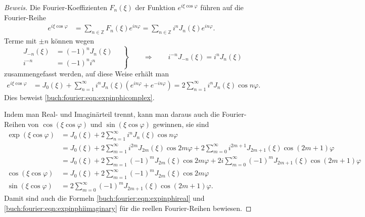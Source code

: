 \begin{proof}[Beweis]
Die Fourier-Koeffizienten $F_n(\xi)$ der Funktion $e^{i\xi\cos\varphi}$
führen auf die Fourier-Reihe
\begin{align*}
e^{i\xi\cos\varphi}
&=
\sum_{n\in\mathbb{Z}} F_n(\xi) e^{in\varphi}
=
\sum_{n\in\mathbb{Z}} i^n J_n(\xi) e^{in\varphi}.
\end{align*}
Terme mit $\pm n$ können wegen
\[
\left.
\begin{aligned}
J_{-n}(\xi) &= (-1)^n J_n(\xi)
\label{buch:fourier:eqn:symetrie}
\\
i^{-n}&=(-1)^n i^n
\end{aligned}
\quad
\right\}
\qquad\Rightarrow\qquad
i^{-n}J_{-n}(\xi) = i^n J_n(\xi)
\]
zusammengefasst werden, auf diese Weise erhält man 
\begin{align*}
e^{i\xi\cos\varphi}
&=
J_0(\xi)
+
\sum_{n=1}^\infty i^n J_n(\xi) (e^{in\varphi}+e^{-in\varphi})
=
2\sum_{n=1}^\infty i^n J_n(\xi) \cos n\varphi.
\end{align*}
Dies beweist
\eqref{buch:fourier:eqn:expinphicomplex}.

Indem man Real- und Imaginärteil trennt, kann man daraus auch
die Fourier-Reihen von $\cos(\xi\cos\varphi)$ und
$\sin(\xi\cos\varphi)$ gewinnen, sie sind
\begin{align*}
\exp(\xi\cos\varphi)
&=
J_0(\xi) + 2\sum_{n=1}^\infty i^{n} J_{n}(\xi) \cos n\varphi
\\
&=
J_0(\xi)
+
2\sum_{m=1}^\infty i^{2m}J_{2m}(\xi)\cos 2m\varphi
+
2\sum_{m=0}^\infty i^{2m+1}J_{2m+1}(\xi)\cos(2m+1)\varphi
\\
&=
J_0(\xi)
+
2\sum_{m=1}^\infty (-1)^{m}J_{2m}(\xi)\cos 2m\varphi
+
2i\sum_{m=0}^\infty (-1)^{m}J_{2m+1}(\xi)\cos(2m+1)\varphi
\\
\cos(\xi\cos\varphi)
&=
J_0(\xi)
+
2\sum_{m=1}^\infty (-1)^{m}J_{2m}(\xi)\cos 2m\varphi
\\
\sin(\xi\cos\varphi)
&=
2\sum_{m=0}^\infty (-1)^m J_{2m+1}(\xi) \cos(2m+1)\varphi.
\end{align*}
Damit sind auch die Formeln
\eqref{buch:fourier:eqn:expinphireal}
und
\eqref{buch:fourier:eqn:expinphiimaginary}
für die reellen Fourier-Reihen bewiesen.
\end{proof}

%
%
